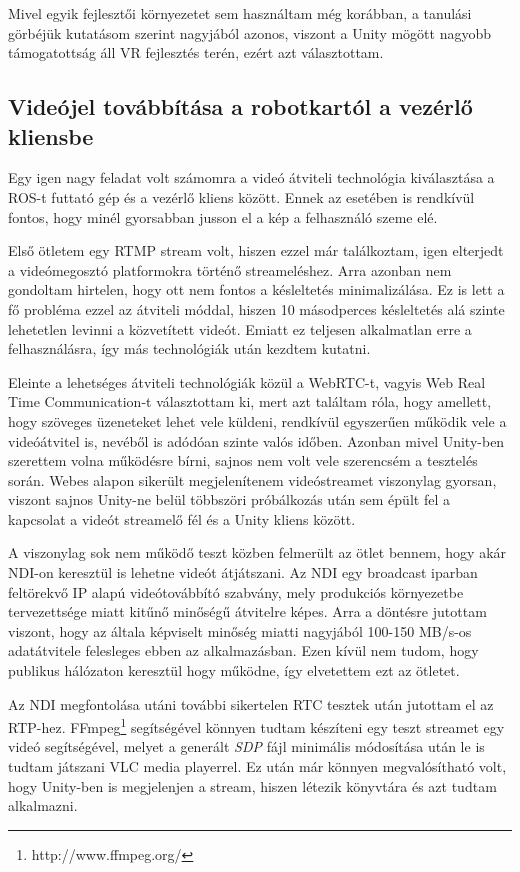 \documentclass[11pt,a4paper,oneside]{article}
\begin{document}
Mivel egyik fejlesztői környezetet sem használtam még korábban, a tanulási görbéjük kutatásom szerint nagyjából azonos, viszont a Unity mögött nagyobb támogatottság áll VR fejlesztés terén, ezért azt választottam.

\subsection{Videójel továbbítása a robotkartól a vezérlő kliensbe}

Egy igen nagy feladat volt számomra a videó átviteli technológia kiválasztása a ROS-t futtató gép és a vezérlő kliens között. Ennek az esetében is rendkívül fontos, hogy minél gyorsabban jusson el a kép a felhasználó szeme elé.

Első ötletem egy RTMP stream volt, hiszen ezzel már találkoztam, igen elterjedt a videómegosztó platformokra történő streameléshez. Arra azonban nem gondoltam hirtelen, hogy ott nem fontos a késleltetés minimalizálása. Ez is lett a fő probléma ezzel az átviteli móddal, hiszen 10 másodperces késleltetés alá szinte lehetetlen levinni a közvetített videót. Emiatt ez teljesen alkalmatlan erre a felhasználásra, így más technológiák után kezdtem kutatni.

Eleinte a lehetséges átviteli technológiák közül a WebRTC-t, vagyis Web Real Time Communication-t választottam ki, mert azt találtam róla, hogy amellett, hogy szöveges üzeneteket lehet vele küldeni, rendkívül egyszerűen működik vele a videóátvitel is, nevéből is adódóan szinte valós időben. Azonban mivel Unity-ben szerettem volna működésre bírni, sajnos nem volt vele szerencsém a tesztelés során. Webes alapon sikerült megjelenítenem videóstreamet viszonylag gyorsan, viszont sajnos Unity-ne belül többszöri próbálkozás után sem épült fel a kapcsolat a videót streamelő fél és a Unity kliens között.

A viszonylag sok nem működő teszt közben felmerült az ötlet bennem, hogy akár NDI-on keresztül is lehetne videót átjátszani. Az NDI egy broadcast iparban feltörekvő IP alapú videótovábbító szabvány, mely produkciós környezetbe tervezettsége miatt kitűnő minőségű átvitelre képes. Arra a döntésre jutottam viszont, hogy az általa képviselt minőség miatti nagyjából 100-150 MB/s-os adatátvitele felesleges ebben az alkalmazásban. Ezen kívül nem tudom, hogy publikus hálózaton keresztül hogy működne, így elvetettem ezt az ötletet.

Az NDI megfontolása utáni további sikertelen RTC tesztek után jutottam el az RTP-hez. FFmpeg\footnote{http://www.ffmpeg.org/} segítségével könnyen tudtam készíteni egy teszt streamet egy videó segítségével, melyet a generált \textit{SDP} fájl minimális módosítása után le is tudtam játszani VLC media playerrel. Ez után már könnyen megvalósítható volt, hogy Unity-ben is megjelenjen a stream, hiszen létezik könyvtára és azt tudtam alkalmazni.
\end{document}
